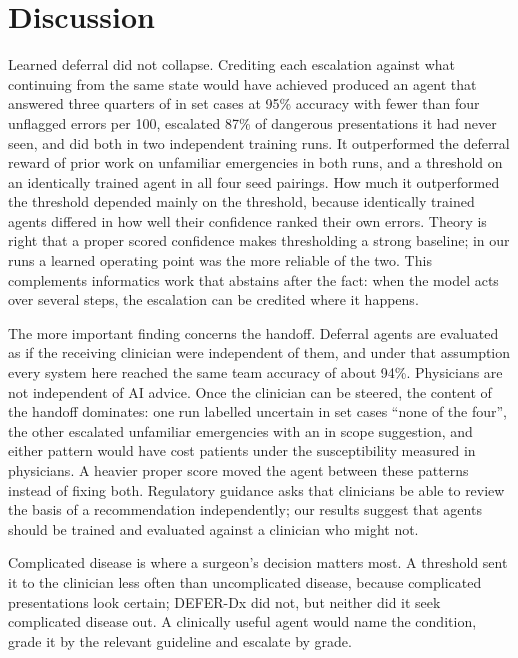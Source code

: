 \documentclass[11pt]{article}
\begin{document}
\section*{Discussion}

Learned deferral did not collapse. Crediting each escalation against what continuing from the same state would have achieved produced an agent that answered three quarters of in set cases at 95\% accuracy with fewer than four unflagged errors per 100, escalated 87\% of dangerous presentations it had never seen, and did both in two independent training runs. It outperformed the deferral reward of prior work on unfamiliar emergencies in both runs, and a threshold on an identically trained agent in all four seed pairings. How much it outperformed the threshold depended mainly on the threshold, because identically trained agents differed in how well their confidence ranked their own errors. Theory is right that a proper scored confidence makes thresholding a strong baseline\cite{che2026}; in our runs a learned operating point was the more reliable of the two. This complements informatics work that abstains after the fact\cite{swaminathan2024,brown2026}: when the model acts over several steps, the escalation can be credited where it happens.

The more important finding concerns the handoff. Deferral agents are evaluated as if the receiving clinician were independent of them, and under that assumption every system here reached the same team accuracy of about 94\%. Physicians are not independent of AI advice\cite{barrit2026,dratsch2023,goddard2012}. Once the clinician can be steered, the content of the handoff dominates: one run labelled uncertain in set cases ``none of the four'', the other escalated unfamiliar emergencies with an in scope suggestion, and either pattern would have cost patients under the susceptibility measured in physicians. A heavier proper score moved the agent between these patterns instead of fixing both. Regulatory guidance asks that clinicians be able to review the basis of a recommendation independently\cite{fda2026}; our results suggest that agents should be trained and evaluated against a clinician who might not.

Complicated disease is where a surgeon's decision matters most. A threshold sent it to the clinician less often than uncomplicated disease, because complicated presentations look certain; DEFER-Dx did not, but neither did it seek complicated disease out. A clinically useful agent would name the condition, grade it by the relevant guideline and escalate by grade\cite{nori2025}.
\end{document}
